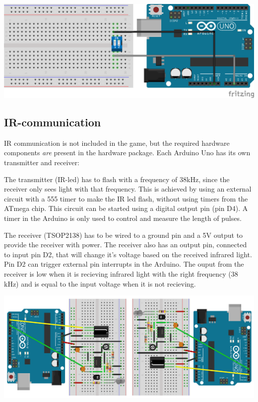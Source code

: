 \includegraphics[width=\textwidth,height=\textheight,keepaspectratio]{res/DIP-switch.png}

\subsection{IR-communication}
\label{sec:ir-communication}

IR communication is not included in the game, but the required hardware
components \emph{are} present in the hardware package. Each Arduino Uno has its
own transmitter and receiver:

The transmitter (IR-led) has to flash with a frequency of 38kHz, since the
receiver only sees light with that frequency. This is achieved by using an
external circuit with a 555 timer to make the IR led flash, without using
timers from the ATmega chip. This circuit can be started using a digital output
pin (pin D4). A timer in the Arduino is only used to control and measure the
length of pulses.

The receiver (TSOP2138) has to be wired to a ground pin and a 5V output to
provide the receiver with power. The receiver also has an output pin, connected
to input pin D2, that will change it's voltage based on the received infrared
light. Pin D2 can trigger external pin interrupts in the Arduino. The ouput
from the receiver is low when it is recieving infrared light with the right
frequency (38 kHz) and is equal to the input voltage when it is not recieving.

\includegraphics[width=\textwidth,height=\textheight,keepaspectratio]{res/wiring_scheme.png}

